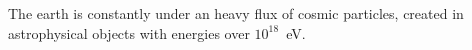 The earth is constantly under an heavy flux of cosmic particles, created in astrophysical objects with  energies over $10^{18}$~eV. 
